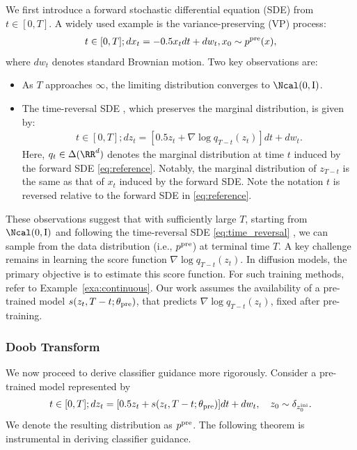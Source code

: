 We first introduce a forward stochastic differential equation (SDE) from $t \in [0,T]$. A widely used example is the variance-preserving (VP) process:
\begin{align}\label{eq:reference}
  t \in [0,T];  dx_t = -0.5 x_t dt +  dw_t, x_0 \sim p^{\mathrm{pre}}(x), 
\end{align} 
where $dw_t$ denotes standard Brownian motion. Two key observations are:
\begin{itemize}
    \item As $T$ approaches $\infty$, the limiting distribution converges to $\Ncal(0,\rI)$. 
    \item The time-reversal SDE \citep{anderson1982reverse}, which preserves the marginal distribution, is given by: 
    \begin{align}\label{eq:time_reversal}
    t \in [0,T];    dz_t = [0.5z_t + \nabla \log q_{T-t}(z_t)]dt + dw_t. 
    \end{align}
    Here, $q_t\in \Delta(\RR^d)$ denotes the marginal distribution at time $t$ induced by the forward SDE \eqref{eq:reference}. Notably, the marginal distribution of $z_{T-t}$ is the same as that of $x_t$ induced by the forward SDE.  Note the notation $t$ is reversed relative to the forward SDE in \eqref{eq:reference}.
    
\end{itemize}

These observations suggest that with sufficiently large $T$, starting from $\Ncal(0,\rI)$ and following the time-reversal SDE \eqref{eq:time_reversal}
, we can sample from the data distribution (i.e., $p^{\mathrm{pre}}$) at terminal time $T$. A key challenge remains in learning the score function $\nabla \log q_{T-t}(z_t)$. In diffusion models, the primary objective is to estimate this score function. For such training methods, refer to Example~\ref{exa:continuous}. Our work assumes the availability of a pre-trained model $ s(z_{t},T-t; \theta_{\mathrm{pre}})$, that predicts $\nabla \log q_{T-t}(z_t)$, fixed after pre-training. 

\subsubsection{Doob Transform}  

We now proceed to derive classifier guidance more rigorously. Consider a pre-trained model represented by
 \begin{align}\label{eq:pre_trained_SDE}
    t \in [0,T];    dz_t = [0.5z_t + s(z_{t},T-t; \theta_{\mathrm{pre}}) ]dt + dw_t, \quad z_0\sim \delta_{z^\mathrm{ini}_0}.    
\end{align}
We denote the resulting distribution as $p^{\mathrm{pre}}$. The following theorem is instrumental in deriving classifier guidance.


